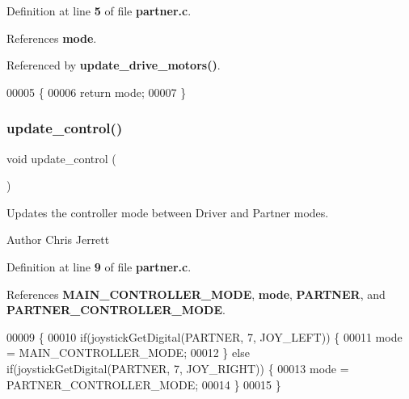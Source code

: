 Definition at line \textbf{ 5} of file \textbf{ partner.\+c}.



References \textbf{ mode}.



Referenced by \textbf{ update\+\_\+drive\+\_\+motors()}.


\begin{DoxyCode}
00005                               \{
00006   \textcolor{keywordflow}{return} mode;
00007 \}
\end{DoxyCode}
\mbox{\label{partner_8h_ab2c78903a76d2ed8969271803c78368a}} 
\subsubsection{update\+\_\+control()}
{\footnotesize\ttfamily void update\+\_\+control (\begin{DoxyParamCaption}{ }\end{DoxyParamCaption})}



Updates the controller mode between Driver and Partner modes. 

\begin{DoxyAuthor}{Author}
Chris Jerrett 
\end{DoxyAuthor}


Definition at line \textbf{ 9} of file \textbf{ partner.\+c}.



References \textbf{ M\+A\+I\+N\+\_\+\+C\+O\+N\+T\+R\+O\+L\+L\+E\+R\+\_\+\+M\+O\+DE}, \textbf{ mode}, \textbf{ P\+A\+R\+T\+N\+ER}, and \textbf{ P\+A\+R\+T\+N\+E\+R\+\_\+\+C\+O\+N\+T\+R\+O\+L\+L\+E\+R\+\_\+\+M\+O\+DE}.


\begin{DoxyCode}
00009                       \{
00010   \textcolor{keywordflow}{if}(joystickGetDigital(PARTNER, 7, JOY\_LEFT)) \{
00011     mode = MAIN_CONTROLLER_MODE;
00012   \} \textcolor{keywordflow}{else} \textcolor{keywordflow}{if}(joystickGetDigital(PARTNER, 7, JOY\_RIGHT)) \{
00013     mode = PARTNER_CONTROLLER_MODE;
00014   \}
00015 \}
\end{DoxyCode}
